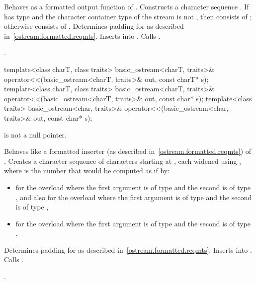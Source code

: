 \begin{itemdescr}
\pnum
\effects
Behaves as a formatted output function
of . Constructs a character sequence .
If  has type
and the character container type of the stream is not
,
then  consists of
;
otherwise  consists of
. Determines padding for  as described
in~\ref{ostream.formatted.reqmts}. Inserts  into
. Calls .

\pnum
\returns
{}.
\end{itemdescr}

%
\begin{itemdecl}
template<class charT, class traits>
  basic_ostream<charT, traits>& operator<<(basic_ostream<charT, traits>& out, const charT* s);
template<class charT, class traits>
  basic_ostream<charT, traits>& operator<<(basic_ostream<charT, traits>& out, const char* s);
template<class traits>
  basic_ostream<char, traits>& operator<<(basic_ostream<char, traits>& out, const char* s);
\end{itemdecl}

\begin{itemdescr}
\pnum
\expects
{} is not a null pointer.

\pnum
\effects
Behaves like a formatted inserter (as described in~\ref{ostream.formatted.reqmts}) of .
Creates a character sequence  of  characters
starting at , each widened using
,
where  is the number that would be computed as if by:
\begin{itemize}
\item
{}
for the overload where the first argument is of type
and the second is of type
,
and also for the overload where the first argument is of type
and the second is of type
,
\item
{}
for the overload where the first argument is of type
and the second is of type
.
\end{itemize}
Determines padding for  as described
in~\ref{ostream.formatted.reqmts}. Inserts  into
. Calls .

\pnum
\returns
{}.
\end{itemdescr}

